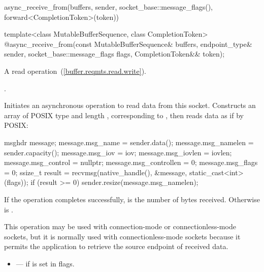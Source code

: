 \begin{itemdescr}
\pnum
\returns
\begin{codeblock}
async_receive_from(buffers, sender, socket_base::message_flags(),
                   forward<CompletionToken>(token))
\end{codeblock}
\end{itemdescr}

\begin{itemdecl}
template<class MutableBufferSequence, class CompletionToken>
  @\DEDUCED@ async_receive_from(const MutableBufferSequence& buffers,
                             endpoint_type& sender,
                             socket_base::message_flags flags,
                             CompletionToken&& token);
\end{itemdecl}

\begin{itemdescr}
\pnum
A read operation~(\ref{buffer.reqmts.read.write}).

\pnum
\completionsig {}.

\pnum
\effects Initiates an asynchronous operation to read data from this socket. Constructs an array  of POSIX type  and length , corresponding to , then reads data as if by POSIX:
\begin{codeblock}
msghdr message;
message.msg_name = sender.data();
message.msg_namelen = sender.capacity();
message.msg_iov = iov;
message.msg_iovlen = iovlen;
message.msg_control = nullptr;
message.msg_controllen = 0;
message.msg_flags = 0;
ssize_t result = recvmsg(native_handle(), &message, static_cast<int>(flags));
if (result >= 0)
  sender.resize(message.msg_namelen);
\end{codeblock}


\pnum
If the operation completes successfully,  is the number of bytes received. Otherwise  is .

\pnum
 \begin{note} This operation may be used with connection-mode or connectionless-mode sockets, but it is normally used with connectionless-mode sockets because it permits the application to retrieve the source endpoint of received data. \end{note}

\pnum
\errors
\begin{itemize}
\item
{} --- if  is set in flags.
\end{itemize}
\end{itemdescr}

